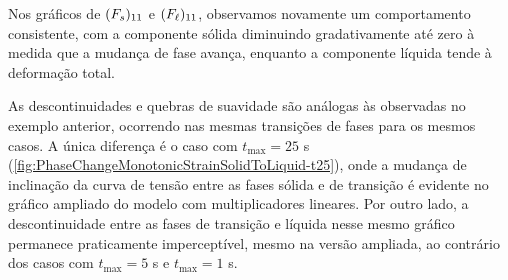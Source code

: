 \documentclass[Tese.tex]{subfiles}
\begin{document}
Nos gráficos de $(F_s)_{11}$ e $(F_\ell)_{11}$, observamos novamente um comportamento consistente, com a componente sólida diminuindo gradativamente até zero à medida que a mudança de fase avança, enquanto a componente líquida tende à deformação total.

As descontinuidades e quebras de suavidade são análogas às observadas no exemplo anterior, ocorrendo nas mesmas transições de fases para os mesmos casos. A única diferença é o caso com $t_\text{max} = 25$ s (\cref{fig:PhaseChangeMonotonicStrainSolidToLiquid-t25}), onde a mudança de inclinação da curva de tensão entre as fases sólida e de transição é evidente no gráfico ampliado do modelo com multiplicadores lineares. Por outro lado, a descontinuidade entre as fases de transição e líquida nesse mesmo gráfico permanece praticamente imperceptível, mesmo na versão ampliada, ao contrário dos casos com $t_\text{max} = 5$ s e $t_\text{max} = 1$ s.
\end{document}
